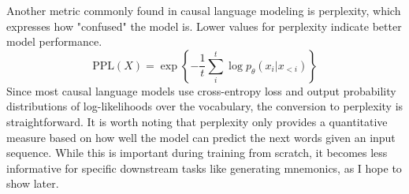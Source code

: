 Another metric commonly found in causal language modeling is perplexity, which expresses how "confused" the model is. Lower values for perplexity indicate better model performance.
\begin{equation} \label{eq:ppl}
    \text{PPL}(X) = \exp \left\{ {-\frac{1}{t}\sum_i^t \log p_\theta (x_i|x_{<i}) } \right\}
\end{equation}
Since most causal language models use cross-entropy loss and output probability distributions of log-likelihoods over the vocabulary, the conversion to perplexity is straightforward. It is worth noting that perplexity only provides a quantitative measure based on how well the model can predict the next words given an input sequence. While this is important during training from scratch, it becomes less informative for specific downstream tasks like generating mnemonics, as I hope to show later.


